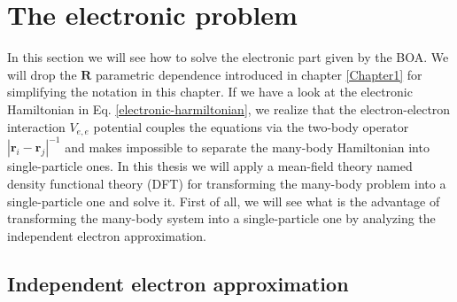 
\chapter{The electronic problem} %

\label{Chapter2} %


In this section we will see how to solve the electronic part given by the BOA. We will drop the $\mathbf{R}$ parametric dependence introduced in chapter \ref{Chapter1} for simplifying the notation in this chapter. If  we have a 
look at the electronic Hamiltonian in Eq. \ref{electronic-harmiltonian}, we realize that the electron-electron interaction $V_{e,e}$ potential couples the equations via the two-body operator $|\mathbf{r}_{i}-\mathbf{r}_{j}|^{-1}$ and 
makes impossible to separate the many-body Hamiltonian into single-particle ones. In this thesis we will apply a mean-field theory named density functional theory (DFT) for transforming the many-body problem into a single-particle 
one and solve it. First of all, we will see what is the advantage of transforming the many-body system into a single-particle one by analyzing the independent electron approximation.

\section{Independent electron approximation}

